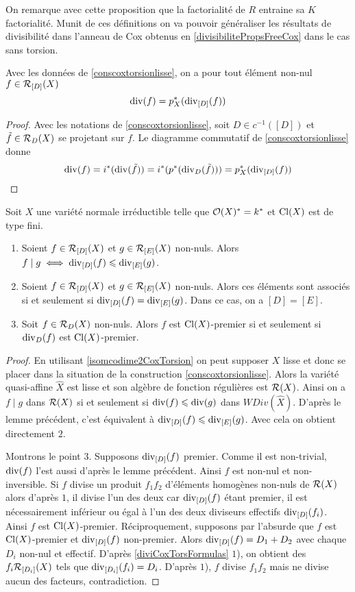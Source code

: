 On remarque avec cette proposition que la factorialité de $R$ entraine sa $K$ factorialité. Munit de ces définitions on va pouvoir généraliser les résultats de divisibilité dans l'anneau de Cox obtenus en \ref{divisibilitePropsFreeCox} dans le cas sans torsion.

\begin{lem}
Avec les données de \ref{conscoxtorsionlisse}, on a pour tout élément non-nul $f\in \mathcal{R}_{[D]}(X)$
$$\operatorname{div}(f)=p^*_X(\operatorname{div}_{[D]}(f))$$
\end{lem}
\begin{proof}
Avec les notations de \ref{conscoxtorsionlisse}, soit $D\in c^{-1}([D])$ et $\tilde{f}\in\mathcal{R}_D(X)$ se projetant sur $f$. Le diagramme commutatif de \ref{conscoxtorsionlisse} donne
$$\operatorname{div}(f)=i^*(\operatorname{div}(\tilde{f}))=i^*(p^*(\operatorname{div}_D(\tilde{f})))=p_X^*(\operatorname{div}_{[D]}(f))$$
\end{proof}

\begin{prop}
Soit $X$ une variété normale irréductible telle que $\mathcal{O}(X)^*=k^*$ et $\operatorname{Cl}(X)$ est de type fini.
\begin{enumerate}
\item Soient $f\in \mathcal{R}_{[D]}(X)$ et $g\in \mathcal{R}_{[E]}(X)$ non-nuls. Alors $f\mid g\iff \operatorname{div}_{[D]}(f)\leqslant\operatorname{div}_{[E]}(g)$.
\item Soient $f\in \mathcal{R}_{[D]}(X)$ et $g\in \mathcal{R}_{[E]}(X)$ non-nuls. Alors ces éléments sont associés si et seulement si $\operatorname{div}_{[D]}(f)=\operatorname{div}_{[E]}(g)$. Dans ce cas, on a $[D]=[E]$.
\item Soit $f\in \mathcal{R}_D(X)$ non-nuls. Alors $f$ est $\operatorname{Cl}(X)$-premier si et seulement si $\operatorname{div}_D(f)$ est $\operatorname{Cl}(X)$-premier.
\end{enumerate}
\end{prop}
\begin{proof}
En utilisant \ref{isomcodime2CoxTorsion} on peut supposer $X$ lisse et donc se placer dans la situation de la construction \ref{conscoxtorsionlisse}. Alors la variété quasi-affine $\widehat{X}$ est lisse et son algèbre de fonction régulières est $\mathcal{R}(X)$. Ainsi on a $f\mid g$ dans $\mathcal{R}(X)$ si et seulement si $\operatorname{div}(f)\leqslant \operatorname{div}(g)$ dans $WDiv(\widehat{X})$. D'après le lemme précédent, c'est équivalent à $\operatorname{div}_{[D]}(f)\leqslant\operatorname{div}_{[E]}(g)$. Avec cela on obtient directement $2$.

Montrons le point $3$. Supposons $\operatorname{div}_{[D]}(f)$ premier. Comme il est non-trivial, $\operatorname{div}(f)$ l'est aussi d'après le lemme précédent. Ainsi $f$ est non-nul et non-inversible. Si $f$ divise un produit $f_1f_2$ d'éléments homogènes non-nuls de $\mathcal{R}(X)$ alors d'après $1$, il divise l'un des deux car $\operatorname{div}_{[D]}(f)$ étant premier, il est nécessairement inférieur ou égal à l'un des deux diviseurs effectifs  $\operatorname{div}_{[D]}(f_i)$. Ainsi $f$ est $\operatorname{Cl}(X)$-premier. Réciproquement, supposons par l'absurde que $f$ est $\operatorname{Cl}(X)$-premier et $\operatorname{div}_{[D]}(f)$ non-premier. Alors $\operatorname{div}_{[D]}(f)=D_1+D_2$ avec chaque $D_i$ non-nul et effectif. D'après \ref{diviCoxTorsFormulas} $1$), on obtient des $f_i\mathcal{R}_{[D_i]}(X)$ tels que $\operatorname{div}_{[D_i]}(f_i)=D_i$. D'après $1$), $f$ divise $f_1f_2$ mais ne divise aucun des facteurs, contradiction.
\end{proof}

